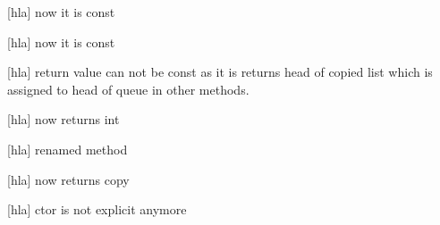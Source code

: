 
\begin{DoxyRefList}
\item[Member \mbox{\hyperlink{class_c_priority_queue_a2885795cb5dfa1e59417e76da83a7143}{C\+Priority\+Queue\+::C\+Priority\+Queue}} (const C\+Cell $\ast$a\+Cell, const size\+\_\+t a\+Size)]\label{bugfix__bugfix000001}%
%
\mbox{[}hla\mbox{]} now it is const  
\item[Member \mbox{\hyperlink{class_c_priority_queue_a69ca91e05dc765a247086c8b64b611bb}{C\+Priority\+Queue\+::deep\+Copy\+List}} (const C\+Cell $\ast$a\+Cell)]\label{bugfix__bugfix000002}%
%
\mbox{[}hla\mbox{]} now it is const  
\item[Member \mbox{\hyperlink{class_c_priority_queue_ad0dbaeb1ba7e97e2fca0028412e0296f}{C\+Priority\+Queue\+::Compare}} (const \mbox{\hyperlink{class_c_priority_queue}{C\+Priority\+Queue}} \&a\+Queue) const]\label{bugfix__bugfix000003}%
%
\mbox{[}hla\mbox{]} return value can not be const as it is returns head of copied list which is assigned to head of queue in other methods.  
\item[Member \mbox{\hyperlink{class_c_priority_queue_a67f91e44c892b11427494e3cfa911afe}{C\+Priority\+Queue\+::is\+Empty}} () const]\label{bugfix__bugfix000004}%
%
\mbox{[}hla\mbox{]} now returns int  
\item[Member \mbox{\hyperlink{class_c_priority_queue_aa100932a3ac1015c2bf01fe75c0da8f1}{C\+Priority\+Queue\+::enqueue}} (const C\+Cell \&a\+Cell, const int a\+Priority=0)]\label{bugfix__bugfix000005}%
%
\mbox{[}hla\mbox{]} renamed method  
\item[Member \mbox{\hyperlink{class_c_priority_queue_a31fff6bd44a9b1c3b19ae90b57abcb38}{C\+Priority\+Queue\+::set}} (const C\+Cell a\+Cell, int a\+Pos=0)]\label{bugfix__bugfix000006}%
%
\mbox{[}hla\mbox{]} now returns copy  
\item[Member \mbox{\hyperlink{class_c_priority_queue_a2f4bab2e00d05b2b3935973198ac768b}{C\+Priority\+Queue\+::C\+Priority\+Queue}} (const \mbox{\hyperlink{class_c_priority_queue}{C\+Priority\+Queue}} \&a\+Queue)]\label{bugfix__bugfix000007}%
%
\mbox{[}hla\mbox{]} ctor is not explicit anymore  
\item[Member \mbox{\hyperlink{class_c_priority_queue_a0c3629e0d5cf105886127ca8b783e7fd}{C\+Priority\+Queue\+::C\+Priority\+Queue}} (const C\+Cell $\ast$a\+Cells, size\+\_\+t a\+Cells\+Count, const int $\ast$a\+Priorities, size\+\_\+t a\+Priorities\+Count)]\label{bugfix__bugfix000008}%

\end{DoxyRefList}
